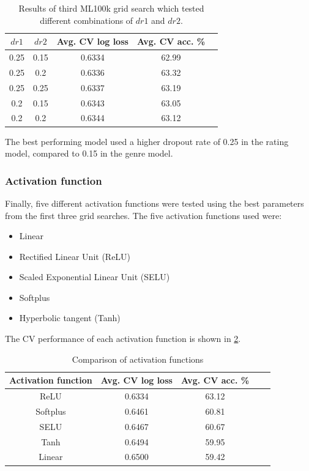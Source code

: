 \begin{table}[H]
\centering
\begin{tabular}{c | c | c | c | c}
\toprule
\textbf{$dr1$} & \textbf{$dr2$} & \textbf{Avg. CV log loss} & \textbf{Avg. CV acc.} \% \\
\midrule
0.25 & 0.15 & 0.6334 & 62.99 \\
\midrule
0.25 & 0.2 & 0.6336 & 63.32 \\
\midrule
0.25 & 0.25 & 0.6337 & 63.19 \\
\midrule
0.2 & 0.15 & 0.6343 & 63.05 \\
\midrule
0.2 & 0.2 & 0.6344 & 63.12 \\
\bottomrule
\end{tabular}
\caption[MovieLens 100k grid search results -- dropout rates]{Results of third ML100k grid search which tested different combinations of $dr1$ and $dr2$.}
\label{tab:ml100k-grid-results3}
\end{table}

The best performing model used a higher dropout rate of 0.25 in the rating model, compared to 0.15 in the genre model.

\subsubsection{Activation function}
Finally, five different activation functions were tested using the best parameters from the first three grid searches. The five activation functions used were:
\begin{itemize}
    \item Linear
    \item Rectified Linear Unit (ReLU)
    \item Scaled Exponential Linear Unit (SELU)
    \item Softplus
    \item Hyperbolic tangent (Tanh)
\end{itemize}
The CV performance of each activation function is shown in \ref{tab:ml100k-activations}.

\begin{table}[H]
\centering
\begin{tabular}{c | c | c | c | c}
\toprule
\textbf{Activation function} & \textbf{Avg. CV log loss} & \textbf{Avg. CV acc.} \% \\
\midrule
ReLU & 0.6334 & 63.12 \\
\midrule
Softplus & 0.6461 & 60.81 \\
\midrule
SELU & 0.6467 & 60.67 \\
\midrule
Tanh & 0.6494 & 59.95 \\
\midrule
Linear & 0.6500 & 59.42 \\
\bottomrule
\end{tabular}
\caption[MovieLens 100k grid search results -- activation function]{Comparison of activation functions}
\label{tab:ml100k-activations}
\end{table}

